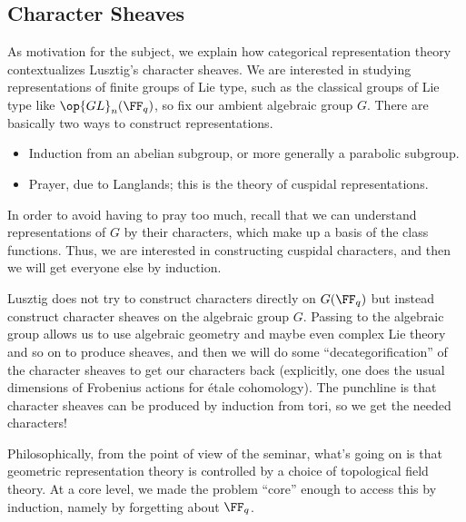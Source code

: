 \documentclass{article}
\begin{document}
\subsection{Character Sheaves}
As motivation for the subject, we explain how categorical representation theory contextualizes Lusztig's character sheaves. We are interested in studying representations of finite groups of Lie type, such as the classical groups of Lie type like $\op{GL}_n(\FF_q)$, so fix our ambient algebraic group $G$. There are basically two ways to construct representations.
\begin{itemize}
	\item Induction from an abelian subgroup, or more generally a parabolic subgroup.
	\item Prayer, due to Langlands; this is the theory of cuspidal representations.
\end{itemize}
In order to avoid having to pray too much, recall that we can understand representations of $G$ by their characters, which make up a basis of the class functions. Thus, we are interested in constructing cuspidal characters, and then we will get everyone else by induction.

Lusztig does not try to construct characters directly on $G(\FF_q)$ but instead construct character sheaves on the algebraic group $G$. Passing to the algebraic group allows us to use algebraic geometry and maybe even complex Lie theory and so on to produce sheaves, and then we will do some ``decategorification'' of the character sheaves to get our characters back (explicitly, one does the usual dimensions of Frobenius actions for \'etale cohomology). The punchline is that character sheaves can be produced by induction from tori, so we get the needed characters!
\begin{remark}
	Philosophically, from the point of view of the seminar, what's going on is that geometric representation theory is controlled by a choice of topological field theory. At a core level, we made the problem ``core'' enough to access this by induction, namely by forgetting about $\FF_q$.
\end{remark}
\end{document}
